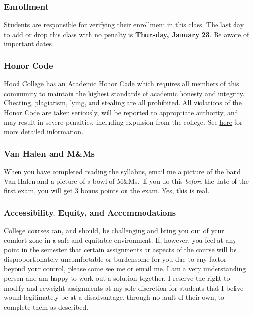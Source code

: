 \documentclass{article}
\begin{document}
\hypertarget{enrollment}{%
\subsubsection{Enrollment}\label{enrollment}}

Students are responsible for verifying their enrollment in this class.
The last day to add or drop this class with no penalty is
\textbf{Thursday, January 23}. Be aware of
\href{https://www.hood.edu/offices-services/registrars-office/academic-calendar}{important
dates}.

\hypertarget{honor-code}{%
\subsubsection{Honor Code}\label{honor-code}}

Hood College has an Academic Honor Code which requires all members of
this community to maintain the highest standards of academic honesty and
integrity. Cheating, plagiarism, lying, and stealing are all prohibited.
All violations of the Honor Code are taken seriously, will be reported
to appropriate authority, and may result in severe penalties, including
expulsion from the college. See
\href{http://hood.smartcatalogiq.com/en/2016-2017/Catalog/The-Spirit-of-Hood/The-Academic-Honor-Code-and-Code-of-Conduct}{here}
for more detailed information.

\hypertarget{van-halen-and-mms}{%
\subsubsection{Van Halen and M\&Ms}\label{van-halen-and-mms}}

When you have completed reading the syllabus, email me a picture of the
band Van Halen and a picture of a bowl of M\&Ms.~If you do this
\emph{before} the date of the first exam, you will get 3 bonus points on
the exam. Yes, this is real.

\hypertarget{accessibility-equity-and-accommodations}{%
\subsubsection{Accessibility, Equity, and
Accommodations}\label{accessibility-equity-and-accommodations}}

College courses can, and should, be challenging and bring you out of
your comfort zone in a safe and equitable environment. If, however, you
feel at any point in the semester that certain assignments or aspects of
the course will be disproportionately uncomfortable or burdensome for
you due to any factor beyond your control, please come see me or email
me. I am a very understanding person and am happy to work out a solution
together. I reserve the right to modify and reweight assignments at my
sole discretion for students that I belive would legitimately be at a
disadvantage, through no fault of their own, to complete them as
described.
\end{document}
